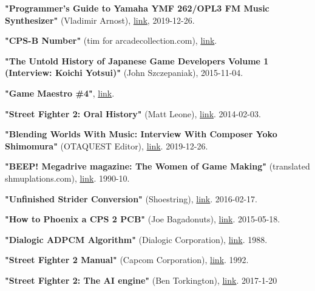 \begin{thebibliography}{999}
  \textbf{"Programmer's Guide to Yamaha YMF 262/OPL3 FM Music Synthesizer"} (Vladimir Arnost),
  \href{https://www.fit.vutbr.cz/~arnost/opl/opl3.html}{link},
  2019-12-26.

  \textbf{"CPS-B Number"} (tim for arcadecollection.com),
  \href{http://www.arcadecollecting.com/info/cps-b_numbers.html}{link}.

  
  \textbf{"The Untold History of Japanese Game Developers Volume 1 (Interview: Koichi Yotsui)"} (John Szczepaniak),
  2015-11-04.

  \textbf{"Game Maestro \#4"}, \href{http://shmuplations.com/akiman/}{link}.

  \textbf{"Street Fighter 2: Oral History"} (Matt Leone),
  \href{https://www.polygon.com/a/street-fighter-2-oral-history/}{link}.
  2014-02-03.

  \textbf{"Blending Worlds With Music: Interview With Composer Yoko Shimomura"} (OTAQUEST Editor),
  \href{https://www.otaquest.com/yoko-shimomura-interview/}{link}.
  2019-12-26.
  
  \textbf{"BEEP! Megadrive magazine: The Women of Game Making"} (translated shmuplations.com),
  \href{https://shmuplations.com/womenofgamedesign/}{link}.
  1990-10.

  \textbf{"Unfinished Strider Conversion"} (Shoestring),
  \href{https://www.jammarcade.net/strider-conversion/}{link}.
  2016-02-17.

  \textbf{"How to Phoenix a CPS 2 PCB"} (Joe Bagadonuts),
  \href{https://www.youtube.com/watch?v=HFj8Mkw_kog}{link}.
  2015-05-18.

  \textbf{"Dialogic ADPCM Algorithm"} (Dialogic Corporation),
  \href{https://multimedia.cx/mirror/dialogic-adpcm.pdf}{link}.
  1988.



  \textbf{"Street Fighter 2 Manual"} (Capcom Corporation),
  \href{https://www.gamesdatabase.org/Media/SYSTEM/Arcade/Manual/formated/Street_Fighter_II--_Champion_Edition_-_1992_-_Capcom.pdf}{link}.
  1992.

  \textbf{"Street Fighter 2: The AI engine"} (Ben Torkington),
  \href{https://sf2platinum.wordpress.com/2017/01/20/the-ai-engine}{link}.
  2017-1-20


\end{thebibliography}
